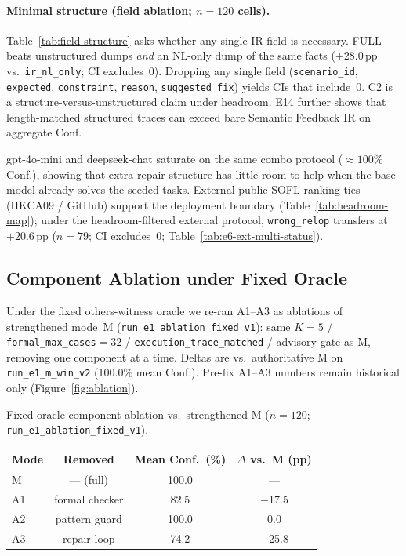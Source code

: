 

\paragraph{Minimal structure (field ablation; $n{=}120$ cells).}
Table~\ref{tab:field-structure} asks whether any single IR field is necessary.
FULL beats unstructured dumps \emph{and} an NL-only dump of the same facts
(${+}28.0$\,pp vs.\ \texttt{ir\_nl\_only}; CI excludes~0).
Dropping any single field (\texttt{scenario\_id}, \texttt{expected},
\texttt{constraint}, \texttt{reason}, \texttt{suggested\_fix}) yields CIs
that include~0.
C2 is a structure-versus-unstructured claim under headroom.
E14 further shows that length-matched structured traces can exceed bare
Semantic Feedback IR on aggregate Conf.



gpt-4o-mini and deepseek-chat saturate on the same combo protocol
(${\approx}100\%$ Conf.), showing that extra repair structure has little room
to help when the base model already solves the seeded tasks.
External public-SOFL ranking ties (HKCA09 / GitHub) support the deployment
boundary
(Table~\ref{tab:headroom-map}); under the headroom-filtered external protocol,
\texttt{wrong\_relop} transfers at ${+}20.6$\,pp ($n{=}79$; CI excludes~0;
Table~\ref{tab:e6-ext-multi-status}).

\subsection{Component Ablation under Fixed Oracle}
\label{sec:results:ablation-fixed}

Under the fixed others-witness oracle we re-ran A1--A3 as ablations of
strengthened mode~M (\texttt{run\_e1\_ablation\_fixed\_v1}): same $K{=}5$ /
\texttt{formal\_max\_cases}${}{=}32$ / \texttt{execution\_trace\_matched} /
advisory gate as M, removing one component at a time.
Deltas are vs.\ authoritative M on \texttt{run\_e1\_m\_win\_v2}
(100.0\% mean Conf.).
Pre-fix A1--A3 numbers remain historical only (Figure~\ref{fig:ablation}).

\begin{inlinetable}{Fixed-oracle component ablation vs.\ strengthened M
  ($n{=}120$; \texttt{run\_e1\_ablation\_fixed\_v1}).}
  \label{tab:ablation-fixed}
  \begin{tabular}{lccc}
    \toprule
    Mode & Removed & Mean Conf.\ (\%) & $\Delta$ vs.\ M (pp) \\
    \midrule
    M  & --- (full) & 100.0 & --- \\
    A1 & formal checker & 82.5 & $-$17.5 \\
    A2 & pattern guard & 100.0 & $0.0$ \\
    A3 & repair loop & 74.2 & $-$25.8 \\
    \bottomrule
  \end{tabular}
\end{inlinetable}

